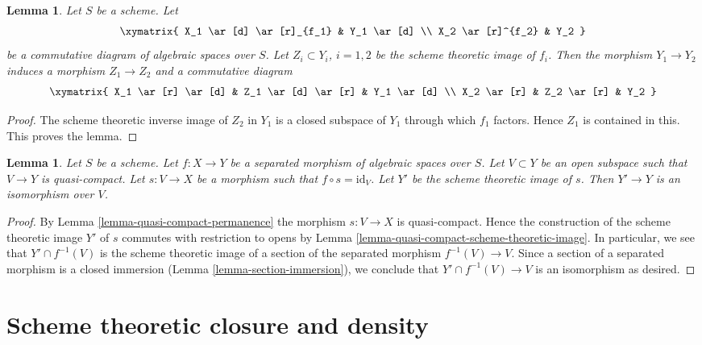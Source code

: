 \documentclass{stacks-project}
\theoremstyle{plain}
\newtheorem{lemma}[subsection]{Lemma}
\theoremstyle{definition}
\theoremstyle{remark}
\numberwithin{equation}{subsection}
\begin{document}
\begin{lemma}
\label{lemma-factor-factor}
Let $S$ be a scheme. Let
$$
\xymatrix{
X_1 \ar[d] \ar[r]_{f_1} & Y_1 \ar[d] \\
X_2 \ar[r]^{f_2} & Y_2
}
$$
be a commutative diagram of algebraic spaces over $S$.
Let $Z_i \subset Y_i$, $i = 1, 2$ be
the scheme theoretic image of $f_i$. Then the morphism
$Y_1 \to Y_2$ induces a morphism $Z_1 \to Z_2$ and a
commutative diagram
$$
\xymatrix{
X_1 \ar[r] \ar[d] & Z_1 \ar[d] \ar[r] & Y_1 \ar[d] \\
X_2 \ar[r] & Z_2 \ar[r] & Y_2
}
$$
\end{lemma}

\begin{proof}
The scheme theoretic inverse image of $Z_2$ in $Y_1$
is a closed subspace of $Y_1$ through
which $f_1$ factors. Hence $Z_1$ is contained in this.
This proves the lemma.
\end{proof}

\begin{lemma}
\label{lemma-scheme-theoretic-image-of-partial-section}
Let $S$ be a scheme.
Let $f : X \to Y$ be a separated morphism of algebraic spaces over $S$.
Let $V \subset Y$ be an open subspace such that $V \to Y$ is quasi-compact.
Let $s : V \to X$ be a morphism such that $f \circ s = \text{id}_V$.
Let $Y'$ be the scheme theoretic image of $s$.
Then $Y' \to Y$ is an isomorphism over $V$.
\end{lemma}

\begin{proof}
By Lemma \ref{lemma-quasi-compact-permanence}
the morphism $s : V \to X$ is quasi-compact.
Hence the construction of the scheme theoretic image $Y'$
of $s$ commutes with restriction to opens by
Lemma \ref{lemma-quasi-compact-scheme-theoretic-image}.
In particular, we see that $Y' \cap f^{-1}(V)$ is the
scheme theoretic image of a section of the separated
morphism $f^{-1}(V) \to V$. Since a section of a separated
morphism is a closed immersion
(Lemma \ref{lemma-section-immersion}),
we conclude that
$Y' \cap f^{-1}(V) \to V$ is an isomorphism as desired.
\end{proof}








\section{Scheme theoretic closure and density}
\label{section-scheme-theoretic-closure}
\end{document}
